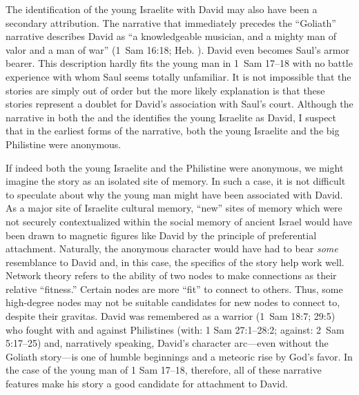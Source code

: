 The identification of the young Israelite with David may also have been a secondary attribution. The narrative that immediately precedes the ``Goliath'' narrative describes David as ``a knowledgeable musician, and a mighty man of valor and a man of war'' (1~Sam 16:18; Heb. ).  David even becomes Saul's armor bearer. This description hardly fits the young man in 1~Sam 17--18 with no battle experience with whom Saul seems totally unfamiliar.%
    \autocite[70--71]{mckenzie2000}
It is not impossible that the stories are simply out of order but the more likely explanation is that these stories represent a doublet for David's association with Saul's court. Although the narrative in both the \mt and the \lxx identifies the young Israelite as David, I suspect that in the earliest forms of the narrative, both the young Israelite and the big Philistine were anonymous.

If indeed both the young Israelite and the Philistine were anonymous, we might imagine the story as an isolated site of memory. In such a case, it is not difficult to speculate about why the young man might have been associated with David. As a major site of Israelite cultural memory, ``new'' sites of memory which were not securely contextualized within the social memory of ancient Israel would have been drawn to magnetic figures like David by the principle of preferential attachment. Naturally, the anonymous character would have had to bear \emph{some} resemblance to David and, in this case, the specifics of the story help work well. Network theory refers to the ability of two nodes to make connections as their relative ``fitness.'' Certain nodes are more ``fit'' to connect to others. Thus, some high-degree nodes may not be suitable candidates for new nodes to connect to, despite their gravitas.%
    \autocite[114]{caldarelli2007}
David was remembered as a warrior (1~Sam 18:7; 29:5) who fought with and against Philistines (with: 1 Sam 27:1--28:2; against: 2~Sam 5:17--25) and, narratively speaking, David's character arc---even without the Goliath story---is one of humble beginnings and a meteoric rise by God's favor. In the case of the young man of 1 Sam 17--18, therefore, all of these narrative features make his story a good candidate for attachment to David. 
    
